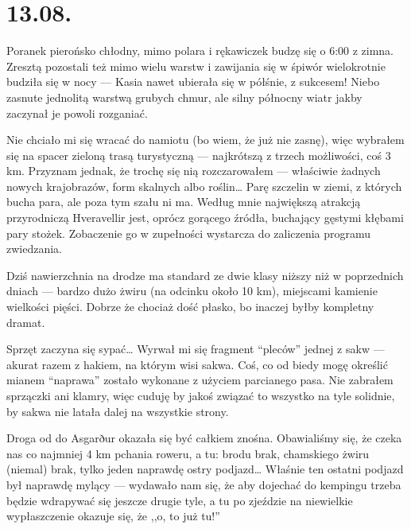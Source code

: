 \chapter*{13.08.}

Poranek pierońsko chłodny, mimo polara i rękawiczek budzę się o 6:00 z zimna. Zresztą pozostali też mimo wielu warstw i zawijania się w śpiwór wielokrotnie budziła się w nocy --- Kasia nawet ubierała się w półśnie, z sukcesem! Niebo zasnute jednolitą warstwą grubych chmur, ale silny północny wiatr jakby zaczynał je powoli rozganiać.

Nie chciało mi się wracać do namiotu (bo wiem, że już nie zasnę), więc wybrałem się na spacer zieloną trasą turystyczną --- najkrótszą z trzech możliwości, coś 3 km. Przyznam jednak, że trochę się nią rozczarowałem --- właściwie żadnych nowych krajobrazów, form skalnych albo roślin… Parę szczelin w ziemi, z których bucha para, ale poza tym szału ni ma. Według mnie największą atrakcją przyrodniczą Hveravellir jest, oprócz gorącego źródła, buchający gęstymi kłębami pary stożek. Zobaczenie go w zupełności wystarcza do zaliczenia programu zwiedzania.


Dziś nawierzchnia na drodze ma standard ze dwie klasy niższy niż w poprzednich dniach --- bardzo dużo żwiru (na odcinku około 10 km), miejscami kamienie wielkości pięści. Dobrze że chociaż dość płasko, bo inaczej byłby kompletny dramat.


Sprzęt zaczyna się sypać… Wyrwał mi się fragment “pleców” jednej z sakw --- akurat razem z hakiem, na którym wisi sakwa. Coś, co od biedy mogę określić mianem “naprawa” zostało wykonane z użyciem parcianego pasa. Nie zabrałem sprzączki ani klamry, więc cuduję by jakoś związać to wszystko na tyle solidnie, by sakwa nie latała dalej na wszystkie strony.

Droga od  do Asgarður okazała się być całkiem znośna. Obawialiśmy się, że czeka nas co najmniej 4 km pchania roweru, a tu: brodu brak, chamskiego żwiru (niemal) brak, tylko jeden naprawdę ostry podjazd… Właśnie ten ostatni podjazd był naprawdę mylący --- wydawało nam się, że aby dojechać do kempingu trzeba będzie wdrapywać się jeszcze drugie tyle, a tu po zjeździe na niewielkie wypłaszczenie okazuje się, że ,,o, to już tu!''

